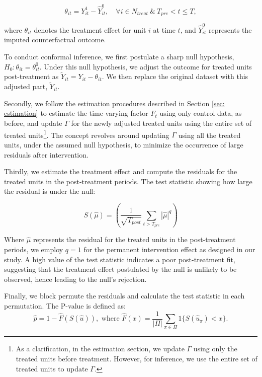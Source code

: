 \documentclass[12pt]{article}
\begin{document}
\begin{equation*}
\theta_{it} = Y^1_{it} - \hat{Y}^0_{it}, \quad \forall i \in N_{treat} \ \& \ T_{pre} < t \leq T,
\end{equation*}

\noindent where $\theta_{it}$ denotes the treatment effect for unit $i$ at time $t$, and $\hat{Y}^0_{it}$ represents the imputed counterfactual outcome. 

To conduct conformal inference, we first postulate a sharp null hypothesis, $H_0: \theta_{it} = \theta_{it}^0$. Under this null hypothesis, we adjust the outcome for treated units post-treatment as $\tilde{Y}_{it} = Y_{it} - \theta_{it}$. We then replace the original dataset with this adjusted part, $\tilde{Y}_{it}$. 

Secondly, we follow the estimation procedures described in Section \ref{sec: estimation} to estimate the time-varying factor $F_t$ using only control data, as before, and update $\Gamma$ for the newly adjusted treated units using the entire set of treated units\footnote{As a clarification, in the estimation section, we update $\Gamma$ using only the treated units before treatment. However, for inference, we use the entire set of treated units to update $\Gamma$.}. The concept revolves around updating $\Gamma$ using all the treated units, under the assumed null hypothesis, to minimize the occurrence of large residuals after intervention.

Thirdly, we estimate the treatment effect and compute the residuals for the treated units in the post-treatment periods. The test statistic showing how large the residual is under the null:

\begin{equation}
S(\hat{\mu}) = \left(\frac{1}{\sqrt{T_{post}}}\sum_{t > T_{pre}} |\hat{\mu}|^q \right)
\end{equation}

Where $\hat{\mu}$ represents the residual for the treated units in the post-treatment periods, we employ $q=1$ for the permanent intervention effect as designed in our study. A high value of the test statistic indicates a poor post-treatment fit, suggesting that the treatment effect postulated by the null is unlikely to be observed, hence leading to the null's rejection. 

Finally, we block permute the residuals and calculate the test statistic in each permutation. The P-value is defined as:
\begin{equation}
\hat{p} = 1 - \hat{F}(S(\hat{u})), \text{ where } \hat{F}(x) = \frac{1}{|\Pi|} \sum_{\pi \in \Pi} 1\{S(\hat{u}_\pi) < x\}.
\end{equation}
\end{document}
